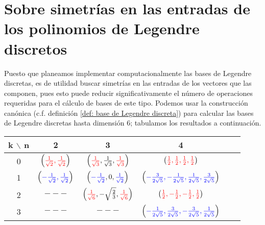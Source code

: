 \chapter{Sobre simetrías en las entradas de los polinomios de Legendre discretos}
\label{section: sobre simetrias en las entradas de los poliomios discretos de Legendre}
Puesto que planeamos implementar computacionalmente
las bases de Legendre discretas, es de utilidad 
buscar simetrías en las entradas de los vectores que las 
componen, pues esto puede reducir significativamente
el número de operaciones requeridas para el cálculo 
de bases de este tipo.
Podemos usar la construcción canónica (c.f. 
definición \ref{def: base de Legendre discreta}) para calcular
las bases de Legendre discretas hasta dimensión $6$; tabulamos
los resultados a continuación.

\begin{center}
\begin{tabular}{ c c c c c c }
k $\backslash$ n & 2 & 3 & 4   \\ 
\hline

0 & $\left(
{\color{red}{\frac{1}{\sqrt{2}}, \frac{1}{\sqrt{2}}}}
\right)$ & 
$\left(
{\color{red}{\frac{1}{\sqrt{3}}}}, 
\frac{1}{\sqrt{3}}, 
{\color{red}{\frac{1}{\sqrt{3}}}} 
\right)$ &   
$\left(
{\color{red}{\frac{1}{2}, \frac{1}{2}, \frac{1}{2}, \frac{1}{2}}}
\right)$ \\ 
1 & 
$\left(
{\color{blue}{-\frac{1}{\sqrt{2}}, \frac{1}{\sqrt{2}}}}
\right)$ & 
$\left(
{\color{blue}{-\frac{1}{\sqrt{2}}}}, 0, 
{\color{blue}{\frac{1}{\sqrt{2}}}} 
\right) $ & 
$\left(
{\color{blue}{-\frac{3}{2\sqrt{5}}, -\frac{1}{2\sqrt{5}}, \frac{1}{2\sqrt{5}}, \frac{3}{2\sqrt{5}}}} 
\right)$  \\ 
2 & $---$ & $\left(
{\color{red}{\frac{1}{\sqrt{6}}}}, -\sqrt{\frac{2}{3}}, 
{\color{red}{\frac{1}{\sqrt{6}}}} \right) $ & 
$\left(
{\color{red}{\frac{1}{2}, -\frac{1}{2}, -\frac{1}{2}, \frac{1}{2}}} 
\right)$ \\ 
3 & $---$ & $---$ & 
$\left(
{\color{blue}{-\frac{1}{2\sqrt{5}}, \frac{3}{2\sqrt{5}}, -\frac{3}{2\sqrt{5}}, \frac{1}{2\sqrt{5}}}}
\right)$  \\ 
\end{tabular}
\end{center} 
 
